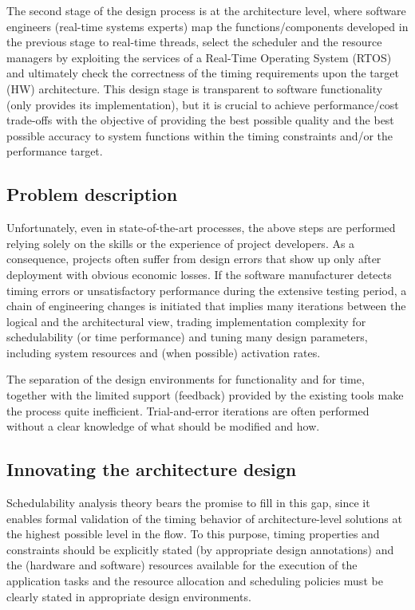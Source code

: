 The second stage of the design process is at the architecture level,
where software engineers (real-time systems experts) map the
functions/components developed in the previous stage to real-time
threads, select the scheduler and the resource managers by exploiting
the services of a Real-Time Operating System (RTOS) and ultimately
check the correctness of the timing requirements upon the target (HW)
architecture. This design stage is transparent to software
functionality (only provides its implementation), but it is crucial to
achieve performance/cost trade-offs with the objective of providing
the best possible quality and the best possible accuracy to system
functions within the timing constraints and/or the performance target.


\subsection{Problem description}

Unfortunately, even in state-of-the-art processes, the above steps are
performed relying solely on the skills or the experience of project
developers. As a consequence, projects often suffer from design errors
that show up only after deployment with obvious economic losses. If
the software manufacturer detects timing errors or unsatisfactory
performance during the extensive testing period, a chain of
engineering changes is initiated that implies many iterations between
the logical and the architectural view, trading implementation
complexity for schedulability (or time performance) and tuning many
design parameters, including system resources and (when possible)
activation rates.

The separation of the design environments for functionality and for
time, together with the limited support (feedback) provided by the
existing tools make the process quite inefficient. Trial-and-error
iterations are often performed without a clear knowledge of what
should be modified and how.


\subsection{Innovating the architecture design}

Schedulability analysis theory bears the promise to fill in this gap,
since it enables formal validation of the timing behavior of
architecture-level solutions at the highest possible level in the
flow. To this purpose, timing properties and constraints should be
explicitly stated (by appropriate design annotations) and the
(hardware and software) resources available for the execution of the
application tasks and the resource allocation and scheduling policies
must be clearly stated in appropriate design environments.

